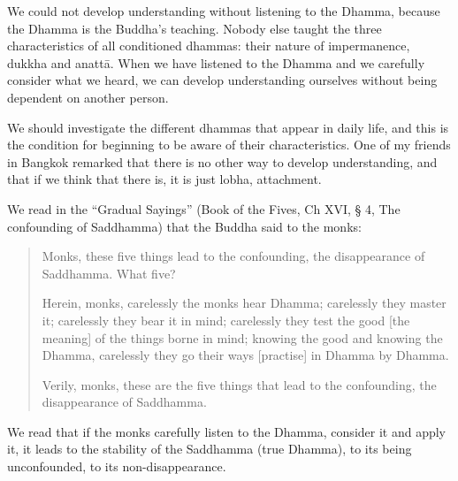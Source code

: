 We could not develop understanding without listening to the Dhamma, because the Dhamma is the Buddha’s teaching. Nobody else taught the three characteristics of all conditioned dhammas: their nature of impermanence, dukkha and anattā. When we have listened to the Dhamma and we carefully consider what we heard, we can develop understanding ourselves without being dependent on another person.

We should investigate the different dhammas that appear in daily life, and this is the condition for beginning to be aware of their characteristics. One of my friends in Bangkok remarked that there is no other way to develop understanding, and that if we think that there is, it is just lobha, attachment.

We read in the ``Gradual Sayings'' (Book of the Fives, Ch XVI, § 4, The confounding of Saddhamma) that the Buddha said to the monks:

\begin{quote}

Monks, these five things lead to the confounding, the disappearance of Saddhamma. What five?

Herein, monks, carelessly the monks hear Dhamma; carelessly they master it; carelessly they bear it in mind; carelessly they test the good [the meaning] of the things borne in mind; knowing the good and knowing the Dhamma, carelessly they go their ways [practise] in Dhamma by Dhamma.

Verily, monks, these are the five things that lead to the confounding, the disappearance of Saddhamma.
\end{quote}

We read that if the monks carefully listen to the Dhamma, consider it and apply it, it leads to the stability of the Saddhamma (true Dhamma), to its being unconfounded, to its non-disappearance.

